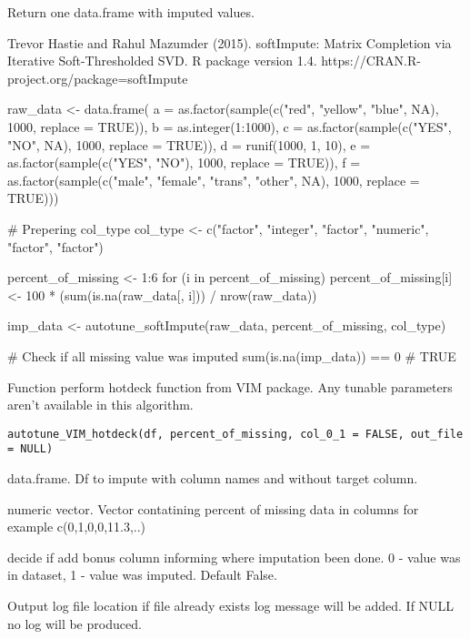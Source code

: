 \documentclass[letterpaper]{book}
\begin{document}
%
\begin{Value}
Return one data.frame with imputed values.
\end{Value}
%
\begin{References}\relax
Trevor Hastie and Rahul Mazumder (2015). softImpute: Matrix Completion via Iterative Soft-Thresholded SVD. R package version 1.4. https://CRAN.R-project.org/package=softImpute
\end{References}
%
\begin{Examples}
\begin{ExampleCode}
{
  raw_data <- data.frame(
    a = as.factor(sample(c("red", "yellow", "blue", NA), 1000, replace = TRUE)),
    b = as.integer(1:1000),
    c = as.factor(sample(c("YES", "NO", NA), 1000, replace = TRUE)),
    d = runif(1000, 1, 10),
    e = as.factor(sample(c("YES", "NO"), 1000, replace = TRUE)),
    f = as.factor(sample(c("male", "female", "trans", "other", NA), 1000, replace = TRUE)))

  # Prepering col_type
  col_type <- c("factor", "integer", "factor", "numeric", "factor", "factor")

  percent_of_missing <- 1:6
  for (i in percent_of_missing) {
    percent_of_missing[i] <- 100 * (sum(is.na(raw_data[, i])) / nrow(raw_data))
  }


  imp_data <- autotune_softImpute(raw_data, percent_of_missing, col_type)

  # Check if all missing value was imputed
  sum(is.na(imp_data)) == 0
  # TRUE
}
\end{ExampleCode}
\end{Examples}
%
\begin{Description}\relax
Function perform hotdeck function from VIM package. Any tunable parameters aren't available in this algorithm.
\end{Description}
%
\begin{Usage}
\begin{verbatim}
autotune_VIM_hotdeck(df, percent_of_missing, col_0_1 = FALSE, out_file = NULL)
\end{verbatim}
\end{Usage}
%
\begin{Arguments}
\begin{ldescription}
\item[\code{df}] data.frame. Df to impute with column names and without  target column.

\item[\code{percent\_of\_missing}] numeric vector. Vector contatining percent of missing data in columns for example  c(0,1,0,0,11.3,..)

\item[\code{col\_0\_1}] decide if add bonus column informing where imputation been done. 0 - value was in dataset, 1 - value was imputed. Default False.

\item[\code{out\_file}] Output log file location if file already exists log message will be added. If NULL no log will be produced.
\end{ldescription}
\end{Arguments}
\end{document}
